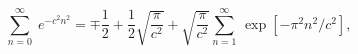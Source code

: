 \begin{equation}
\sum_{n=0}^\infty\;e^{-c^2n^2}=\mp\frac{1}{2}+\frac{1}{2}\sqrt{\frac{\pi}{c^2}}
+\sqrt{\frac{\pi}{c^2}}\sum_{n=1}^\infty\,\exp[-\pi^2n^2/c^2],
\end{equation}


